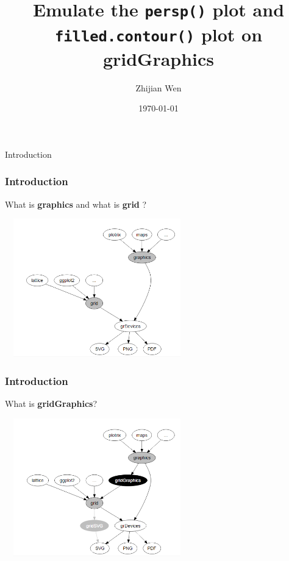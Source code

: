 \documentclass{beamer}
\title[Master Presentation]{
\Large{Emulate the \texttt{persp()} plot and \texttt{filled.contour()} plot on \textbf{gridGraphics}}
} %
\author{Zhijian Wen
} %
\institute[UOA] %
{
{\small Supervisor: Associate Professor Paul Murrell}
\\~\\
University of Auckland \\ %
\medskip
\textit{jwen246@aucklanduni.ac.nz} %
}
\date{\today} %
\begin{document}


\begin{frame}
\titlepage %
\end{frame}




\begin{frame}[fragile]
\begin{center}
  \Huge Introduction
\end{center}
\end{frame}


\begin{frame}[fragile]

\frametitle{Introduction}
What is \textbf{graphics} and what is \textbf{grid} ?
\begin{center}
\includegraphics[width = 8cm, height = 6cm]{plot/grid_and_graphics.PNG}
\end{center}

\end{frame}



\begin{frame}[fragile]

\frametitle{Introduction}

What is \textbf{gridGraphics}?
\begin{center}
\includegraphics[width = 8cm, height = 6cm]{plot/grid_graphics.png}
\end{center}

\end{frame}
\end{document}
